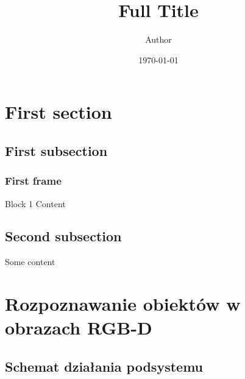 \documentclass{beamer}
\title[Short Title]{Full Title} %
\author{Author} %
\institute[Institute] %
{
Full Institute Name \\ %
\medskip
\textit{\textbf{Promotor:} email} %
}
\date{\today} %
\begin{document}
\begin{frame}
\titlepage %
\end{frame}



\section{First section}
\subsection{First subsection}
\begin{frame}
\frametitle{First frame}
\begin{block}{Block 1}
Content
\end{block}
\end{frame}

\subsection{Second subsection}
\begin{frame}
Some content
\end{frame}

\section{Rozpoznawanie obiektów w obrazach RGB-D}

\subsection{Schemat działania podsystemu}
\end{document}
